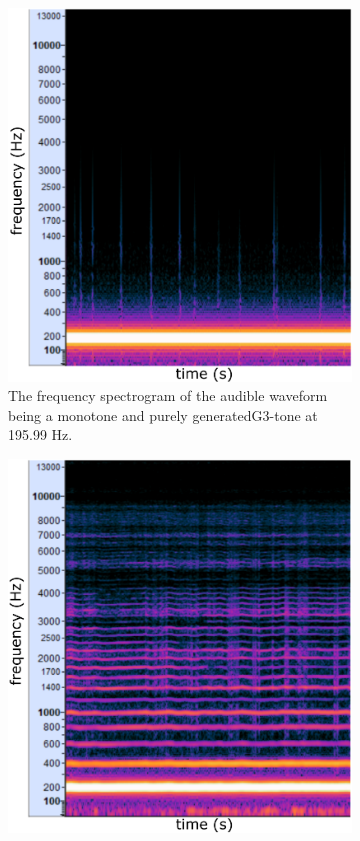 \begin{figure}[ht!]
	\centering
	\begin{subfigure}[t]{.5\textwidth}
		\centering\captionsetup{width=.9\linewidth}%
		\includegraphics[width=0.9\linewidth]{Assets/DocSegments/Chapters/Baseline/Figures/Illustrations/G3_196Hz_PureTone_waveform_spectrogram.pdf}
		\caption{The frequency spectrogram of the audible waveform being a monotone and purely generated\protect\footnotemark  G3-tone at 195.99 Hz.}
		\label{fig:sub:G3_pure_waveform}
	\end{subfigure}%
	\begin{subfigure}[t]{.5\textwidth}
		\centering\captionsetup{width=.9\linewidth}%
		\includegraphics[width=0.9\linewidth]{Assets/DocSegments/Chapters/Baseline/Figures/Illustrations/G3_196Hz_HummingWaveform_FrequencySpectrum.pdf}

\end{subfigure}
\end{figure}
